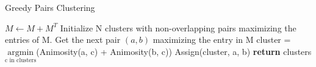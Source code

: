 \documentclass[12pt]{article}
\begin{document}
\begin{algorithm}[H]
    \caption{Greedy Pairs Clustering}
    \label{greedy_pairs}
    \begin{algorithmic}[1] %
         
            \State $M\gets M + M^T$
            \State Initialize N clusters with non-overlapping pairs maximizing the entries of M.
                \State Get the next pair $(a, b)$ maximizing the entry in M
                \State cluster = $\underset{\text{c in clusters}}{\mathrm{argmin}}$(Animosity(a, c) + Animosity(b, c))
                \State Assign(cluster, a, b)
            \EndWhile\label{euclidendwhile}
            \State \textbf{return} clusters
        \EndProcedure
    \end{algorithmic}
\end{algorithm}


%

%
%

%
\end{document}
